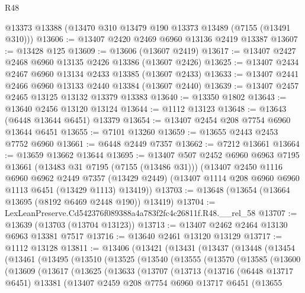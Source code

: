\begin{lexlean}{R48}
\begin{coremodule}
    @13373
    @13388
    (@13470 @310 @13479 @190 @13373 @13489 (@7155 (@13491 @310)))
@13606 := @13407 @2420 @2469 @6960 @13136 @2419 @13387
@13607 := @13428 @125
@13609 := @13606 (@13607 @2419)
@13617 := @13407 @2427 @2468 @6960 @13135 @2426 @13386 (@13607 @2426)
@13625 := @13407 @2434 @2467 @6960 @13134 @2433 @13385 (@13607 @2433)
@13633 := @13407 @2441 @2466 @6960 @13133 @2440 @13384 (@13607 @2440)
@13639 := @13407 @2457 @2465 @13125 @13132 @13379 @13383
@13640 := @13350 @1802
@13643 := @13640 @2456 @13120 @13124
@13644 := @1112 @13123
@13648 := @13643 (@6448 @13644 @6451) @13379
@13654 := @13407 @2454 @208 @7754 @6960 @13644 @6451
@13655 := @7101 @13260
@13659 := @13655 @2443 @2453 @7752 @6960
@13661 := @6448 @2449 @7357
@13662 := @7212 @13661
@13664 := @13659 @13662 @13644
@13695 := @13407
    @507
    @2452
    @6960
    @6963
    @7195
    @13661
    (@13483 @31 @7195 (@7155 (@13486 @31)))
    (@13407
      @2450
      @1116
      @6960
      @6962
      @2449
      @7357
      (@13429 @2449)
      (@13407 @1114 @208 @6960 @6960 @1113 @6451 (@13429 @1113) @13419))
@13703 := @13648 (@13654 (@13664 @13695 (@8192 @6469 @2448 @190)) @13419)
@13704 := LexLeanPreserve.Cd542376f089388a4a783f2fc4c26811f.R48.__rel_58
@13707 := @13639 (@13703 (@13704 @13123))
@13713 := @13407 @2462 @2464 @13130 @6963 @13381 @7517
@13716 := @13640 @2461 @13120 @13129
@13717 := @1112 @13128
@13811 := @13406
    (@13421
      (@13431
        (@13437
          (@13448
            (@13454
              (@13461
                (@13495
                  (@13510
                    (@13525
                      (@13540
                        (@13555
                          (@13570
                            (@13585
                              (@13600
                                (@13609
                                  (@13617
                                    (@13625
                                      (@13633
                                        (@13707
                                          (@13713
                                            (@13716
                                              (@6448 @13717 @6451)
                                              @13381
                                              (@13407
                                                @2459
                                                @208
                                                @7754
                                                @6960
                                                @13717
                                                @6451
                                                (@13655

\end{coremodule}
\end{lexlean}
